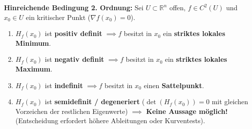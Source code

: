 \begin{theorem}
    \textbf{Hinreichende Bedingung 2. Ordnung:} Sei $U \subset \mathbb{R}^n$ offen, $f \in C^2(U)$ und $x_0 \in U$ ein kritischer Punkt ($\nabla f(x_0) = 0$).
    \begin{enumerate}
        \item $H_f(x_0)$ ist \textbf{positiv definit} $\implies f$ besitzt in $x_0$ ein \textbf{striktes lokales Minimum}.
        \item $H_f(x_0)$ ist \textbf{negativ definit} $\implies f$ besitzt in $x_0$ ein \textbf{striktes lokales Maximum}.
        \item $H_f(x_0)$ ist \textbf{indefinit} $\implies f$ besitzt in $x_0$ einen \textbf{Sattelpunkt}.
        \item $H_f(x_0)$ ist \textbf{semidefinit / degeneriert} ($\det(H_f(x_0)) = 0$ mit gleichen Vorzeichen der restlichen Eigenwerte) $\implies$ \textbf{Keine Aussage möglich!} (Entscheidung erfordert höhere Ableitungen oder Kurventests).
    \end{enumerate}
\end{theorem}

